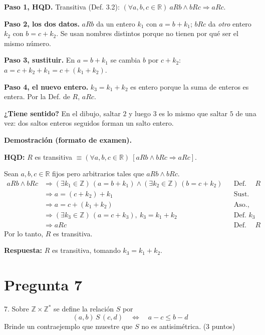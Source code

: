 \documentclass[11pt]{article}
\begin{document}
\begin{explica}
\textbf{Paso 1, HQD.} Transitiva (Def. 3.2): $(\forall a,b,c\in\mathbb R)\ aRb\wedge bRc\Rightarrow aRc$.

\textbf{Paso 2, los dos datos.} $aRb$ da un entero $k_1$ con $a=b+k_1$; $bRc$ da \emph{otro} entero $k_2$ con $b=c+k_2$. Se usan nombres distintos porque no tienen por qué ser el mismo número.

\textbf{Paso 3, sustituir.} En $a=b+k_1$ se cambia $b$ por $c+k_2$: $a=c+k_2+k_1=c+(k_1+k_2)$.

\textbf{Paso 4, el nuevo entero.} $k_3=k_1+k_2$ es entero porque la suma de enteros es entera. Por la Def. de $R$, $aRc$.

\textbf{¿Tiene sentido?} En el dibujo, saltar $2$ y luego $3$ es lo mismo que saltar $5$ de una vez: dos saltos enteros seguidos forman un salto entero.
\end{explica}

\textbf{Demostración (formato de examen).}

\textbf{HQD:} $R$ es transitiva $\equiv(\forall a,b,c\in\mathbb R)\ [aRb\wedge bRc\Rightarrow aRc]$.

Sean $a,b,c\in\mathbb R$ fijos pero arbitrarios tales que $aRb\wedge bRc$.
\begin{align*}
aRb\wedge bRc &\Rightarrow (\exists k_1\in\mathbb Z)\,(a=b+k_1)\wedge(\exists k_2\in\mathbb Z)\,(b=c+k_2) && \text{Def. de } R\\
&\Rightarrow a=(c+k_2)+k_1 && \text{Sust.}\\
&\Rightarrow a=c+(k_1+k_2) && \text{Aso., Con.}\\
&\Rightarrow (\exists k_3\in\mathbb Z)\,(a=c+k_3),\ k_3=k_1+k_2 && \text{Def. } k_3\\
&\Rightarrow aRc && \text{Def. de } R
\end{align*}
Por lo tanto, $R$ es transitiva.

\textbf{Respuesta:} $R$ es transitiva, tomando $k_3=k_1+k_2$.

\clearpage
\section*{Pregunta 7}

7. Sobre $\mathbb Z\times\mathbb Z^*$ se define la relación $S$ por
\[(a,b)\,S\,(c,d)\quad\Leftrightarrow\quad a-c\le b-d\]
Brinde un \colorbox{green!35}{contraejemplo} que muestre que $S$ \colorbox{green!35}{no es antisimétrica}. \hfill (3 puntos)
\end{document}

